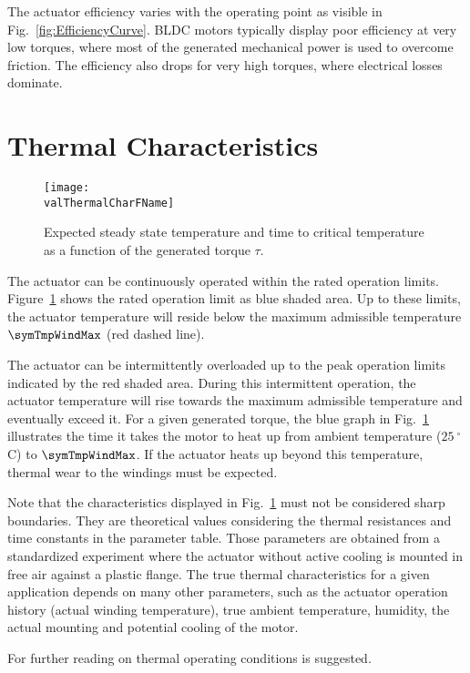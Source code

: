 \documentclass[a4paper,10pt]{cjtdsheet}      %
\begin{document}
\begin{multicols}{2}

The actuator efficiency varies with the operating point as visible in Fig.~\ref{fig:EfficiencyCurve}. BLDC motors typically display poor efficiency at very low torques, where most of the generated mechanical power is used to overcome friction. The efficiency also drops for very high torques, where electrical losses dominate.

\end{multicols}

\newpage

\section{Thermal Characteristics}\label{sec:ThermalChar}

\begin{figure}%
		\texttt{[image: \\valThermalCharFName]}
	\caption{Expected steady state temperature and time to critical temperature as a function of the generated torque $\tau$.}
	\label{fig:ThermalCharacteristics}
\end{figure}

\begin{multicols}{2}

The actuator can be continuously operated within the rated operation limits. Figure~\ref{fig:ThermalCharacteristics} shows the rated operation limit as blue shaded area. Up to these limits, the actuator temperature will reside below the maximum admissible temperature $\symTmpWindMax$ (red dashed line). 

The actuator can be intermittently overloaded up to the peak operation limits indicated by the red shaded area. During this intermittent operation, the actuator temperature will rise towards the maximum admissible temperature and eventually exceed it. For a given generated torque, the blue graph in Fig.~\ref{fig:ThermalCharacteristics} illustrates the time it takes the motor to heat up from ambient temperature ($25\:{^{\circ}}$C) to $\symTmpWindMax$. If the actuator heats up beyond this temperature, thermal wear to the windings must be expected.

Note that the characteristics displayed in Fig.~\ref{fig:ThermalCharacteristics} must not be considered sharp boundaries. They are theoretical values considering the thermal resistances and time constants in the parameter table. Those parameters are obtained from a standardized experiment where the actuator without active cooling is mounted in free air against a plastic flange. The true thermal characteristics for a given application depends on many other parameters, such as the actuator operation history (actual winding temperature), true ambient temperature, humidity, the actual mounting and potential cooling of the motor.

For further reading on thermal operating conditions \cite{Leonhard_2001} is suggested.

\end{multicols}
\end{document}
